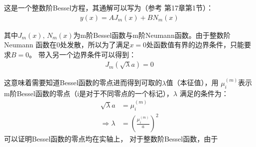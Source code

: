 \documentclass[a4paper]{ctexart}
\begin{document}
	\par 
	这是一个整数阶Bessel方程，其通解可以写为（参考\cite{mathematicalmethod}
	第17章第1节）：
	\begin{align}
		y(x) = AJ_{m}(x) + BN_{m}(x)
	\end{align}
	\par 其中$J_{m}(x),\,N_{m}(x)$为m阶Bessel函数与m阶Neumann函数。由于整数阶Neumann
	函数在0处发散，所以为了满足$x=0$处函数值有界的边界条件，只能要求$B=0$。
	带入另一个边界条件可以得到：
	\begin{align}
		J_{m}(\sqrt{\lambda}a) = 0
	\end{align}
	\par 这意味着需要知道Bessel函数的零点进而得到可取的$\lambda$值（本征值），用
	$\mu_{i}^{(m)}$表示m阶Bessel函数的零点（i是对于不同零点的一个标记），$\lambda$
	满足的条件为：
	\begin{align}
		\sqrt{\lambda} a &= \mu_{i}^{(m)}\\
		\Rightarrow \lambda &= \left(\frac{\mu_{i}^{(m)}}{a}\right)^2 
	\end{align}
	可以证明Bessel函数的零点均在实轴上\cite{specialfunction}，
	对于整数阶Bessel函数，由于
\end{document}
